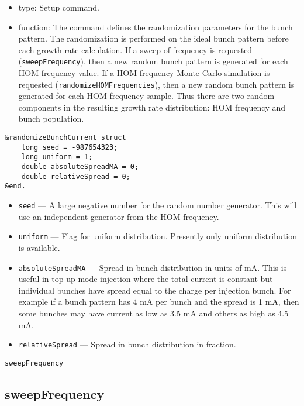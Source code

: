\documentclass[11pt]{article}
\begin{document}
\begin{itemize}
\item type: Setup command.
\item function: The command defines the randomization parameters for
the bunch pattern. The randomization is performed on the ideal bunch
pattern before each growth rate calculation. If a sweep of frequency
is requested ({\tt sweepFrequency}), then a new random bunch pattern
is generated for each HOM frequency value. If a HOM-frequency Monte
Carlo simulation is requested ({\tt randomizeHOMFrequencies}), then a
new random bunch pattern is generated for each HOM frequency
sample. Thus there are two random components in the resulting growth
rate distribution: HOM frequency and bunch population.
\end{itemize}
\begin{verbatim}
&randomizeBunchCurrent struct
    long seed = -987654323;
    long uniform = 1;
    double absoluteSpreadMA = 0;
    double relativeSpread = 0;
&end.
\end{verbatim}
\begin{itemize}
\item {\tt seed} --- A large negative number for the random number generator. This will use an independent generator from the HOM frequency.
\item {\tt uniform} --- Flag for uniform distribution. Presently only uniform distribution is available.
\item {\tt absoluteSpreadMA} --- Spread in bunch distribution in units of mA. This is useful in top-up mode injection where the total current is constant but
individual bunches have spread equal to the charge per injection bunch. For example if a bunch pattern has 4 mA per bunch and the spread is 1 mA, then some  bunches may have current as low as 3.5 mA and others as high as 4.5 mA. 
\item {\tt relativeSpread} --- Spread in bunch distribution in fraction.
\end{itemize}


\newpage
\begin{center}\tt sweepFrequency\end{center}
\subsection{sweepFrequency}
\end{document}
